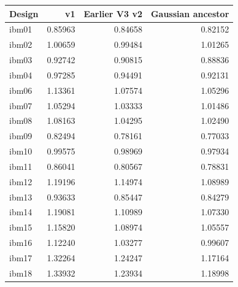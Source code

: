 \begin{tabular}{lrrr}
\toprule
Design & v1 & Earlier V3 v2 & Gaussian ancestor \\
\midrule
ibm01 & 0.85963 & 0.84658 & 0.82152 \\
ibm02 & 1.00659 & 0.99484 & 1.01265 \\
ibm03 & 0.92742 & 0.90815 & 0.88836 \\
ibm04 & 0.97285 & 0.94491 & 0.92131 \\
ibm06 & 1.13361 & 1.07574 & 1.05296 \\
ibm07 & 1.05294 & 1.03333 & 1.01486 \\
ibm08 & 1.08163 & 1.04295 & 1.02490 \\
ibm09 & 0.82494 & 0.78161 & 0.77033 \\
ibm10 & 0.99575 & 0.98969 & 0.97934 \\
ibm11 & 0.86041 & 0.80567 & 0.78831 \\
ibm12 & 1.19196 & 1.14974 & 1.08989 \\
ibm13 & 0.93633 & 0.85447 & 0.84279 \\
ibm14 & 1.19081 & 1.10989 & 1.07330 \\
ibm15 & 1.15820 & 1.08974 & 1.05557 \\
ibm16 & 1.12240 & 1.03277 & 0.99607 \\
ibm17 & 1.32264 & 1.24247 & 1.17164 \\
ibm18 & 1.33932 & 1.23934 & 1.18998 \\
\bottomrule
\end{tabular}
